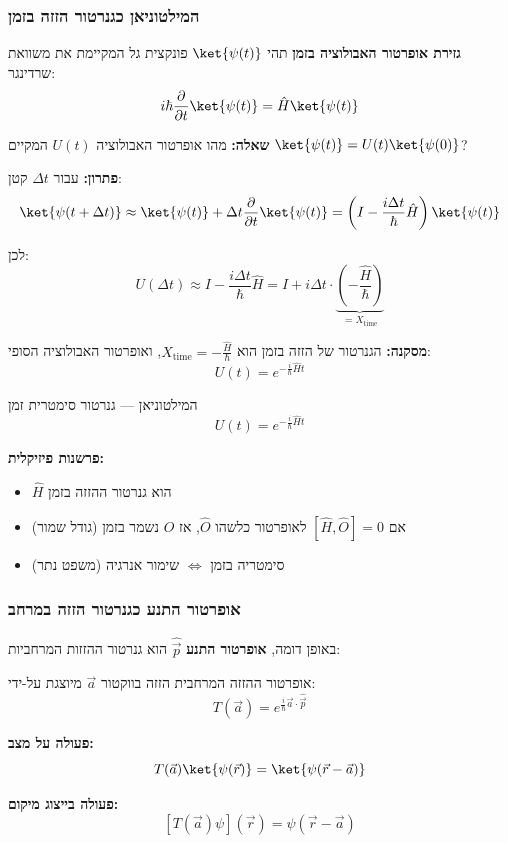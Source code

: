 \subsubsection{המילטוניאן כגנרטור הזזה בזמן}

\textbf{גזירת אופרטור האבולוציה בזמן}
תהי $\ket{\psi(t)}$ פונקצית גל המקיימת את משוואת שרדינגר:
\[
i\hbar \frac{\partial}{\partial t}\ket{\psi(t)} = \hat{H}\ket{\psi(t)}
\]

\textbf{שאלה:} מהו אופרטור האבולוציה $U(t)$ המקיים $\ket{\psi(t)} = U(t)\ket{\psi(0)}$?

\textbf{פתרון:} עבור $\Delta t$ קטן:
\[
\ket{\psi(t + \Delta t)} \approx \ket{\psi(t)} + \Delta t \frac{\partial}{\partial t}\ket{\psi(t)} = \left(I - \frac{i\Delta t}{\hbar}\hat{H}\right)\ket{\psi(t)}
\]

לכן:
\[
U(\Delta t) \approx I - \frac{i\Delta t}{\hbar}\hat{H} = I + i\Delta t \cdot \underbrace{\left(-\frac{\hat{H}}{\hbar}\right)}_{=X_{\text{time}}}
\]

\textbf{מסקנה:} הגנרטור של הזזה בזמן הוא $X_{\text{time}} = -\frac{\hat{H}}{\hbar}$, ואופרטור האבולוציה הסופי:
\[
\boxed{U(t) = e^{-\frac{i}{\hbar}\hat{H}t}}
\]


\begin{importantbox}{המילטוניאן — גנרטור סימטרית זמן}
\[
\boxed{U(t) = e^{-\frac{i}{\hbar}\hat{H}t}}
\]

\textbf{פרשנות פיזיקלית:}
\begin{itemize}
    \item $\hat{H}$ הוא גנרטור ההזזה בזמן
    \item אם $[\hat{H}, \hat{O}] = 0$ לאופרטור כלשהו $\hat{O}$, אז $\hat{O}$ נשמר בזמן (גודל שמור)
    \item סימטריה בזמן $\Leftrightarrow$ שימור אנרגיה (משפט נתר)
\end{itemize}
\end{importantbox}

\subsubsection{אופרטור התנע כגנרטור הזזה במרחב}

באופן דומה, \textbf{אופרטור התנע} $\hat{\vec{p}}$ הוא גנרטור ההזזות המרחביות:

\begin{definitionbox}{אופרטור ההזזה המרחבית}
הזזה בווקטור $\vec{a}$ מיוצגת על-ידי:
\[
\boxed{T(\vec{a}) = e^{\frac{i}{\hbar}\vec{a} \cdot \hat{\vec{p}}}}
\]

\textbf{פעולה על מצב:}
\[
T(\vec{a})\ket{\psi(\vec{r})} = \ket{\psi(\vec{r} - \vec{a})}
\]

\textbf{פעולה בייצוג מיקום:}
\[
[T(\vec{a})\psi](\vec{r}) = \psi(\vec{r} - \vec{a})
\]
\end{definitionbox}

